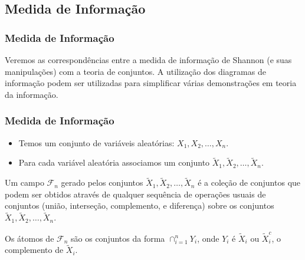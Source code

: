 \subsection{Medida de Informação}
\begin{frame}%
  \frametitle{Medida de Informação}
  Veremos as correspondências entre a medida de informação de Shannon (e suas manipulações)
  com a teoria de conjuntos. A utilização dos diagramas de informação podem ser utilizadas para 
  simplificar várias demonstrações em teoria da informação.
\end{frame}

\begin{frame}%
  \frametitle{Medida de Informação}
  \begin{itemize}
  \item Temos um conjunto de variáveis aleatórias: $X_1, X_2, \ldots, X_n$.
  \item Para cada variável aleatória associamos um conjunto $\tilde{X}_1, \tilde{X}_2, \ldots, \tilde{X}_n$.
  \end{itemize}

  \begin{definition}
  Um campo $\mathcal{F}_n$ gerado pelos conjuntos $\tilde{X}_1, \tilde{X}_2, \ldots, \tilde{X}_n$ é
  a coleção de conjuntos que podem ser obtidos através de qualquer sequência de operações
  usuais de conjuntos (união, interseção, complemento, e diferença) sobre os conjuntos 
  $\tilde{X}_1, \tilde{X}_2, \ldots, \tilde{X}_n$.
  \end{definition}

  \begin{definition}[átomo]
  Os átomos de $\mathcal{F}_n$ são os conjuntos da forma $\cap_{i=1}^n Y_i$, onde 
  $Y_i$ é $\tilde{X}_i$ ou $\tilde{X}_i^c$, o complemento de $\tilde{X}_i$.
  \end{definition}
\end{frame}

